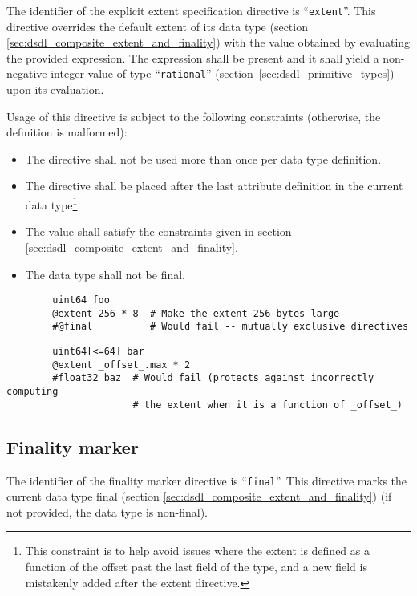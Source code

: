 The identifier of the explicit extent specification directive is ``\verb|extent|''.
This directive overrides the default extent of its data type (section \ref{sec:dsdl_composite_extent_and_finality})
with the value obtained by evaluating the provided expression.
The expression shall be present and it shall yield a non-negative integer value of type
``\verb|rational|'' (section~\ref{sec:dsdl_primitive_types}) upon its evaluation.

Usage of this directive is subject to the following constraints (otherwise, the definition is malformed):
\begin{itemize}
    \item The directive shall not be used more than once per data type definition.
    \item The directive shall be placed after the last attribute definition in the current data type\footnote{%
              This constraint is to help avoid issues where the extent is defined as a function of the offset past
              the last field of the type, and a new field is mistakenly added after the extent directive.
          }.
    \item The value shall satisfy the constraints given in section \ref{sec:dsdl_composite_extent_and_finality}.
    \item The data type shall not be final.
\end{itemize}

\begin{remark}
    \begin{verbatim}
        uint64 foo
        @extent 256 * 8  # Make the extent 256 bytes large
        #@final          # Would fail -- mutually exclusive directives
    \end{verbatim}

    \begin{verbatim}
        uint64[<=64] bar
        @extent _offset_.max * 2
        #float32 baz  # Would fail (protects against incorrectly computing
                      # the extent when it is a function of _offset_)
    \end{verbatim}
\end{remark}

\subsection{Finality marker}\label{sec:dsdl_directive_final}

The identifier of the finality marker directive is ``\verb|final|''.
This directive marks the current data type final (section \ref{sec:dsdl_composite_extent_and_finality})
(if not provided, the data type is non-final).

